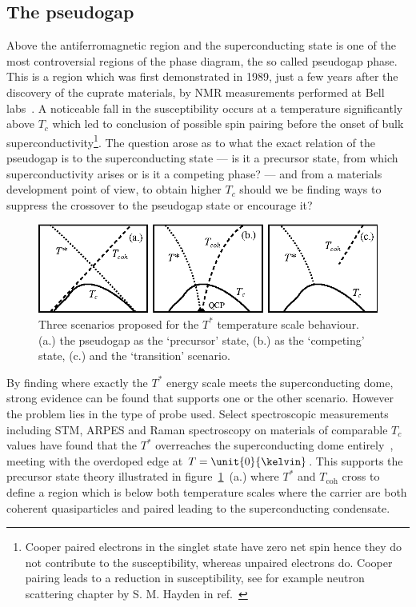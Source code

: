 \subsection{The pseudogap}
    \label{Sec:Intro:Pseudogap}

Above the antiferromagnetic region and the superconducting state is one of the most controversial regions of the phase diagram, the so called pseudogap phase. This is a region which was first demonstrated in 1989, just a few years after the discovery of the cuprate materials, by \ac{NMR} measurements performed at Bell labs~\cite{Warren1989}. A noticeable fall in the susceptibility occurs at a temperature significantly above $T_c$ which led to conclusion of possible spin pairing before the onset of bulk superconductivity\footnote{Cooper paired electrons in the singlet state have zero net spin hence they do not contribute to the susceptibility, whereas unpaired electrons do. Cooper pairing leads to a reduction in susceptibility, see for example neutron scattering chapter by S. M. Hayden in ref.~\cite{Hayden}}. The question arose as to what the exact relation of the pseudogap is to the superconducting state --- is it a precursor state, from which superconductivity arises or is it a competing phase? --- and from a materials development point of view, to obtain higher $T_c$ should we be finding ways to suppress the crossover to the pseudogap state or encourage it?
\begin{figure}[htbp]
    \begin{center}
        \includegraphics[scale=1.3]{Chapter-Introduction/Figures/PGScenarios/PGScenarios}
        \caption{Three scenarios proposed for the $T^*$ temperature scale behaviour. (a.) the pseudogap as the `precursor' state, (b.) as the `competing' state, (c.) and the `transition' scenario.}
        \label{Fig:Intro:PGScenario}
    \end{center}
\end{figure}
By finding where exactly the $T^*$ energy scale meets the superconducting dome, strong evidence can be found that supports one or the other scenario. However the problem lies in the type of probe used. Select spectroscopic measurements including \ac{STM}, \ac{ARPES} and Raman spectroscopy on materials of comparable $T_c$ values have found that the $T^*$ overreaches the superconducting dome entirely~\cite{Hufner2008}, meeting with the overdoped edge at $T=\unit{0}{\kelvin}$. This supports the precursor state theory illustrated in figure~\ref{Fig:Intro:PGScenario}~(a.) where $T^*$ and $T_{\textrm{coh}}$ cross to define a region which is below both temperature scales where the carrier are both coherent quasiparticles and paired leading to the superconducting condensate.

